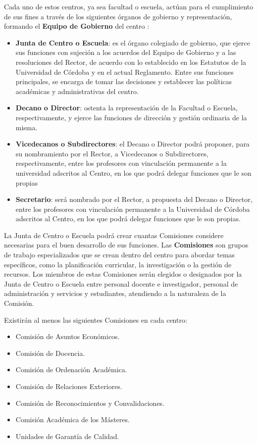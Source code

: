 Cada uno de estos centros, ya sea facultad o escuela, actúan para el cumplimiento de sus fines a través de los siguientes órganos de gobierno y representación, formando el \textbf{Equipo de Gobierno} del centro \cite{reglamento}: 
\begin{itemize}
    \item \textbf{Junta de Centro o Escuela}: es el órgano colegiado de gobierno, que ejerce sus funciones con sujeción a los acuerdos del Equipo de Gobierno y a las resoluciones del Rector, de acuerdo con lo establecido en los Estatutos de la Universidad de Córdoba y en el actual Reglamento. Entre sus funciones principales, se encarga de tomar las decisiones y establecer las políticas académicas y administrativas del centro.
    \item \textbf{Decano o Director}: ostenta la representación de la Facultad o Escuela, respectivamente, y ejerce las funciones de dirección y gestión ordinaria de la misma. 
    \item \textbf{Vicedecanos o Subdirectores}: el Decano o Director podrá proponer, para su nombramiento por el Rector, a Vicedecanos o Subdirectores, respectivamente, entre los profesores con vinculación permanente a la universidad adscritos al Centro, en los que podrá delegar funciones que le son propias

    \item \textbf{Secretario}: será nombrado por el Rector, a propuesta del Decano o Director, entre los profesores con vinculación permanente a la Universidad de Córdoba adscritos al Centro, en los que podrá delegar funciones que le son propias.

\end{itemize}

La Junta de Centro o Escuela podrá crear cuantas Comisiones considere necesarias para el buen desarrollo de sus funciones. Las \textbf{Comisiones} son grupos de trabajo especializados que se crean dentro del centro para abordar temas específicos, como la planificación curricular, la investigación o la gestión de recursos. Los miembros de estas Comisiones serán elegidos o designados por la Junta de Centro o Escuela entre personal docente e investigador, personal de administración y servicios y estudiantes, atendiendo a la naturaleza de la Comisión.

Existirán al menos las siguientes Comisiones en cada centro:
\begin{itemize}
    \item Comisión de Asuntos Económicos.
    \item Comisión de Docencia.
    \item Comisión de Ordenación Académica.
    \item Comisión de Relaciones Exteriores.
    \item Comisión de Reconocimientos y Convalidaciones.
    \item Comisión Académica de los Másteres.
    \item Unidades de Garantía de Calidad.
\end{itemize}
    
